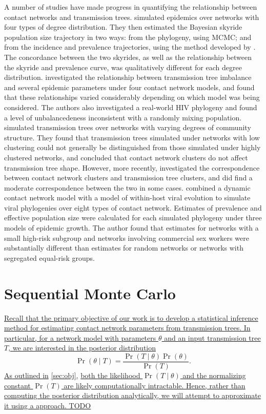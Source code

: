 A number of studies have made progress in quantifying the relationship between
contact networks and transmission trees. \textcite{o2011contact} simulated
epidemics over networks with four types of degree distribution. They then
estimated the Bayesian skyride~\autocite{minin2008smooth} population size
trajectory in two ways: from the phylogeny, using \gls{MCMC}; and from the
incidence and prevalence trajectories, using the method developed by
\textcite{volz2009phylodynamics}. The concordance between the two skyrides, as
well as the relationship between the skyride and prevalence curve, was
qualitatively different for each degree distribution.
\textcite{leventhal2012inferring} investigated the relationship between
transmission tree imbalance and several epidemic parameters under four contact
network models, and found that these relationships varied considerably
depending on which model was being considered. The authors also investigated a
real-world \gls{HIV} phylogeny and found a level of unbalancedeness
inconsistent with a randomly mixing population. \textcite{welch2011network}
simulated transmission trees over networks with varying degrees of community
structure. They found that transmission trees simulated under networks with low
clustering could not generally be distinguished from those simulated under
highly clustered networks, and concluded that contact network clusters do not
affect transmission tree shape. However, more recently,
\textcite{villandre2016assessment} investigated the correspondence between
contact network clusters and transmission tree clusters, and did find a
moderate correspondence between the two in some cases.
\textcite{goodreau2006assessing} combined a dynamic contact network model with
a model of within-host viral evolution to simulate viral phylogenies over eight
types of contact network. Estimates of prevalence and effective population size
were calculated for each simulated phylogeny under three models of epidemic
growth. The author found that estimates for networks with a small high-risk
subgroup and networks involving commercial sex workers were substantially
different than estimates for random networks or networks with segregated
equal-risk groups.

\section{Sequential Monte Carlo}
\label{sec:smc}

{\color{blue}\uline{
Recall that the primary objective of our work is to develop a statistical
inference method for estimating contact network parameters from transmission
trees. In particular, for a network model with parameters $\theta$ and an input
transmission tree $T$, we are interested in the posterior distribution}
\[
  \Pr(\theta \mid T) = \frac{\Pr(T \mid \theta) \Pr(\theta)}{\Pr(T)}.
\]
\uline{As outlined in} \cref{sec:obj}, \uline{both the likelihood $\Pr(T \mid
\theta)$ and the normalizing constant $\Pr(T)$ are likely computationally
intractable. Hence, rather than computing the posterior distribution
analytically, we will attempt to approximate it using a 
approach.
TODO
}}

